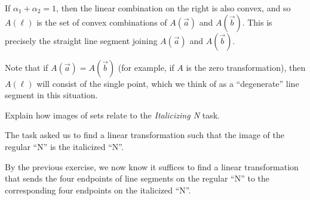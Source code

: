 \begin{parts}
\begin{solution}
				If $\alpha_1+\alpha_2=1$, then the linear combination on the right
				is also convex, and so $A(\ell)$ is the set of convex combinations
				of $A(\vec a)$ and $A(\vec b)$.
				This is precisely the straight line segment joining $A(\vec a)$
				and $A(\vec b)$.

				Note that if $A(\vec a)=A(\vec b)$ (for example, if $A$ is the
				zero transformation), then $A(\ell)$ will consist of the single
				point, which we think of as a ``degenerate'' line segment in this
				situation.
			\end{solution}
		\item Explain how images of sets relate to the \emph{Italicizing N} task.
			\begin{solution}
				The task asked us to find a linear transformation such that the
				image of the regular ``N'' is the italicized ``N''.

				By the previous exercise, we now know it suffices to find a
				linear transformation that sends the four endpoints of line
				segments on the regular ``N'' to the corresponding four endpoints
				on the italicized ``N''.
			\end{solution}
	\end{parts}

